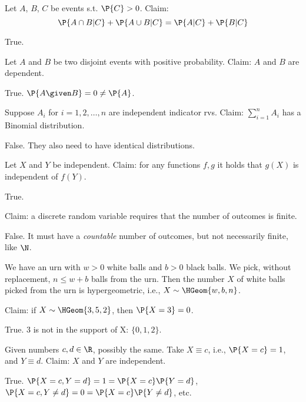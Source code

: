 \documentclass[tf-tutorial-all.tex]{subfiles}
\begin{document}
\begin{truefalse}
Let $A$, $B$, $C$ be events s.t. $\P{C}>0$. Claim:
\begin{equation}
\P{A \cap B | C} + \P{A \cup B | C}=\P{A|C}+\P{B|C}
\end{equation}
\begin{solution}
True.
\end{solution}
\end{truefalse}


\begin{truefalse}
Let $A$ and $B$ be two disjoint events with positive probability. Claim: $A$ and $B$ are dependent.
\begin{solution}
True. $\P{A\given B} = 0 \neq \P{A}$. %
\end{solution}
\end{truefalse}


\begin{truefalse}
  Suppose $A_i$ for $i=1, 2, \dots, n$ are independent indicator rvs.
  Claim: $\sum_{i=1}^n A_i$ has a Binomial distribution.
\begin{solution}
False. They also need to have identical distributions.
\end{solution}
\end{truefalse}

\begin{truefalse}
Let $X$ and $Y$ be independent. Claim: for any functions $f, g$ it holds that $g(X)$ is independent of $f(Y)$.
\begin{solution}
True.
\end{solution}
\end{truefalse}

\begin{truefalse}
Claim: a discrete random variable requires that the  number of outcomes is finite.
\begin{solution}
False. It must have a \emph{countable} number of outcomes, but not necessarily finite, like $\N$.
\end{solution}
\end{truefalse}

\begin{truefalse}
We have an urn with $w>0$ white balls and $b>0$ black balls.
We pick, without replacement, $n\leq w+b$ balls from the urn.
Then the number $X$ of white balls picked from the urn is hypergeometric, i.e., $X\sim\HGeom{w, b, n}$.

Claim: if  $X \sim \HGeom{3, 5, 2}$, then $\P{X = 3} = 0$.
\begin{solution}
True. $3$ is not in the support of X: $\{0, 1, 2\}$.
\end{solution}
\end{truefalse}

\begin{truefalse}
Given numbers $c, d \in \R$, possibly the same.
Take $X\equiv c$, i.e., $\P{X=c} = 1$, and $Y\equiv d$.
Claim: $X$ and $Y$ are independent.
\begin{solution}
True. $\P{X=c, Y=d} = 1 = \P{X=c}\P{Y=d}$, $\P{X=c, Y\neq d} = 0 = \P{X=c} \P{Y\neq d}$, etc.
\end{solution}
\end{truefalse}
\end{document}
